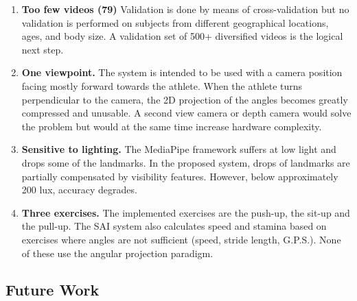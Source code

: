 \documentclass[conference]{IEEEtran}
\begin{document}
\begin{enumerate}
    \item \textbf{Too few videos (79)} Validation is done by means of cross-validation but no validation is performed on subjects from different geographical locations, ages, and body size. A validation set of 500+ diversified videos is the logical next step.
 \item \textbf{One viewpoint.} The system is intended to be used with a camera position facing mostly forward towards the athlete. When the athlete turns perpendicular to the camera, the 2D projection of the angles becomes greatly compressed and unusable. A second view camera or depth camera would solve the problem but would at the same time increase hardware complexity.
 \item \textbf{Sensitive to lighting.} The MediaPipe framework suffers at low light and drops some of the landmarks. In the proposed system, drops of landmarks are partially compensated by visibility features. However, below approximately 200 lux, accuracy degrades.
 \item \textbf{Three exercises.} The implemented exercises are the push-up, the sit-up and the pull-up. The SAI system also calculates speed and stamina based on exercises where angles are not sufficient (speed, stride length, G.P.S.). None of these use the angular projection paradigm.
\end{enumerate}

\subsection{Future Work}
\end{document}
